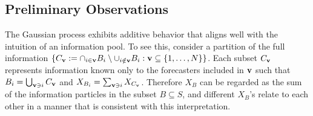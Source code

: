 \documentclass[12pt]{article}
\theoremstyle{definition}
\theoremstyle{definition}
\def\v{{\bf v}}
\begin{document}
\subsection{Preliminary Observations}
\label{prelim}
 The Gaussian process exhibits additive behavior that aligns well with the intuition of an information pool. To see this, consider a partition of the full information $\{ C_\v := \cap_{i \in \v} B_i \setminus \cup_{i \notin \v} B_i : \v \subseteq \{1, \dots, N\}\}$. Each subset $C_\v$ represents information known only to the forecasters included in $\v$ such that $B_i = \bigcup_{\v \ni i} C_\v$ and $X_{B_i} = \sum_{\v \ni i} X_{C_\v}$. Therefore $X_{B}$ can be regarded as the sum of the information particles in the subset $B \subseteq S$, and different $X_{B}$'s relate to each other in a manner that is consistent with this interpretation. 
 
\end{document}
